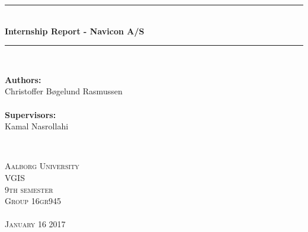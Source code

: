 \begin{titlepage}

\newcommand{\HRule}{\rule{\linewidth}{0.5mm}} %

\center %


\HRule \\[0.5cm]
{\LARGE \bfseries 
Internship Report - Navicon A/S
}\\[0.3cm]
\HRule \\[0.5cm]


\null
\vfill%

\begin{minipage}[b]{0.4\textwidth}
\begin{flushleft} \large
\textbf{Authors:}\\
Christoffer Bøgelund Rasmussen\\
\emph{ }\\
\textbf{Supervisors:}\\
Kamal Nasrollahi\\
\end{flushleft}
\end{minipage}
~
\begin{minipage}[b]{0.4\textwidth}
\begin{flushright} \large
\textsc{\large Aalborg University}\\
\textsc{\large VGIS}\\ 
\textsc{\large 9th semester}\\
\textsc{\large Group 16gr945}\\
\emph{ }\\
\textsc{\small January 16 2017}\\
\end{flushright}
\end{minipage}

\end{titlepage}
